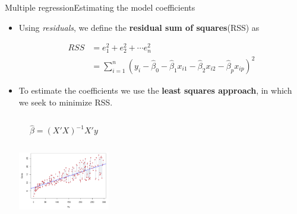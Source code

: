 \begin{frame}{Multiple regression}{Estimating the model coeﬃcients}


\begin{itemize}
    \item Using \textit{residuals}, we define the \textbf{residual sum of squares}(RSS) as \pause

    \begin{align*}
      RSS &=  e_1^2 + e_2^2 + \cdots e_n^2   \\
          &= \sum_{i=1}^n (y_i - \hat{\beta}_0 - \hat{\beta}_1 x_{i1} -  \hat{\beta}_2 x_{i2} - \hat{\beta}_p x_{ip} )^2
    \end{align*}  \pause

    \item To estimate the coefficients we use the \textbf{least squares approach}, in which we seek to minimize RSS.  \pause

    \begin{columns}
         \hspace{0.5cm} $$ \hat{\beta} = (X'X)^{-1} X'y  $$  
            \centering
        \includegraphics[height=4cm, width=4cm]{multiple-lr/ols.png}
    \end{columns} 

\end{itemize}

\end{frame}

